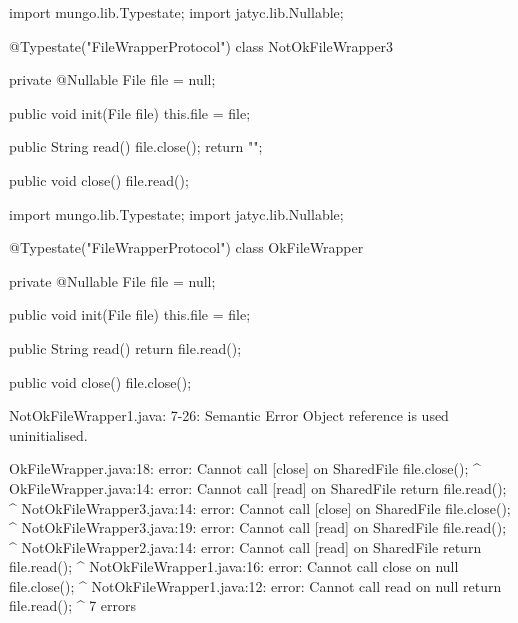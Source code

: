 \begin{code}
import mungo.lib.Typestate;
import jatyc.lib.Nullable;

@Typestate("FileWrapperProtocol")
class NotOkFileWrapper3 {

  private @Nullable File file = null;

  public void init(File file) {
    this.file = file;
  }

  public String read() {
    file.close();
    return "";
  }

  public void close() {
    file.read();
  }

}\end{code}

\begin{code}
import mungo.lib.Typestate;
import jatyc.lib.Nullable;

@Typestate("FileWrapperProtocol")
class OkFileWrapper {

  private @Nullable File file = null;

  public void init(File file) {
    this.file = file;
  }

  public String read() {
    return file.read();
  }

  public void close() {
    file.close();
  }

}\end{code}

\lstset{language=,caption=Mungo's output}
\begin{code}

NotOkFileWrapper1.java: 7-26: Semantic Error
		Object reference is used uninitialised.
\end{code}

\lstset{language=,caption=Our tool's output}
\begin{code}
OkFileWrapper.java:18: error: Cannot call [close] on Shared{File}
    file.close();
    ^
OkFileWrapper.java:14: error: Cannot call [read] on Shared{File}
    return file.read();
           ^
NotOkFileWrapper3.java:14: error: Cannot call [close] on Shared{File}
    file.close();
    ^
NotOkFileWrapper3.java:19: error: Cannot call [read] on Shared{File}
    file.read();
    ^
NotOkFileWrapper2.java:14: error: Cannot call [read] on Shared{File}
    return file.read();
           ^
NotOkFileWrapper1.java:16: error: Cannot call close on null
    file.close();
        ^
NotOkFileWrapper1.java:12: error: Cannot call read on null
    return file.read();
               ^
7 errors
\end{code}

